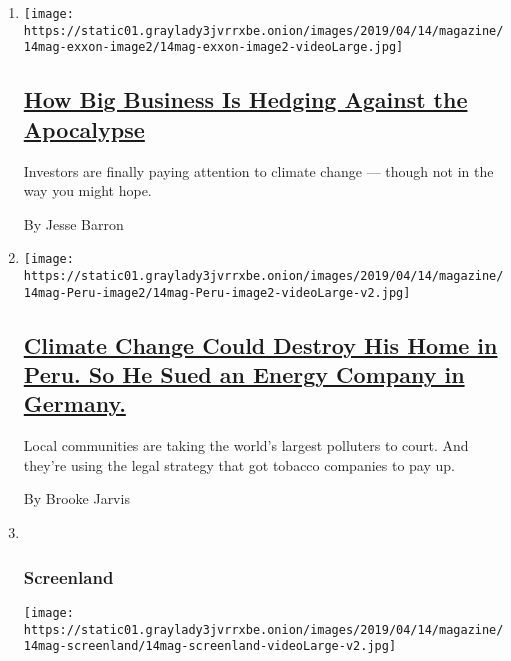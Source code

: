 \begin{enumerate}
\def\labelenumi{\arabic{enumi}.}
\item
  \texttt{[image: https://static01.graylady3jvrrxbe.onion/images/2019/04/14/magazine/14mag-exxon-image2/14mag-exxon-image2-videoLarge.jpg]}

  \hypertarget{how-big-business-is-hedging-against-the-apocalypse}{%
  \subsection{\texorpdfstring{\href{/interactive/2019/04/11/magazine/climate-change-exxon-renewable-energy.html}{How
  Big Business Is Hedging Against the
  Apocalypse}}{How Big Business Is Hedging Against the Apocalypse}}\label{how-big-business-is-hedging-against-the-apocalypse}}

  Investors are finally paying attention to climate change --- though
  not in the way you might hope.

  By Jesse Barron
\item
  \texttt{[image: https://static01.graylady3jvrrxbe.onion/images/2019/04/14/magazine/14mag-Peru-image2/14mag-Peru-image2-videoLarge-v2.jpg]}

  \hypertarget{climate-change-could-destroy-his-home-in-peru-so-he-sued-an-energy-company-in-germany}{%
  \subsection{\texorpdfstring{\href{/interactive/2019/04/09/magazine/climate-change-peru-law.html}{Climate
  Change Could Destroy His Home in Peru. So He Sued an Energy Company in
  Germany.}}{Climate Change Could Destroy His Home in Peru. So He Sued an Energy Company in Germany.}}\label{climate-change-could-destroy-his-home-in-peru-so-he-sued-an-energy-company-in-germany}}

  Local communities are taking the world's largest polluters to court.
  And they're using the legal strategy that got tobacco companies to pay
  up.

  By Brooke Jarvis
\item ~
  \hypertarget{screenland}{%
  \subsubsection{Screenland}\label{screenland}}

  \texttt{[image: https://static01.graylady3jvrrxbe.onion/images/2019/04/14/magazine/14mag-screenland/14mag-screenland-videoLarge-v2.jpg]}


\end{enumerate}
